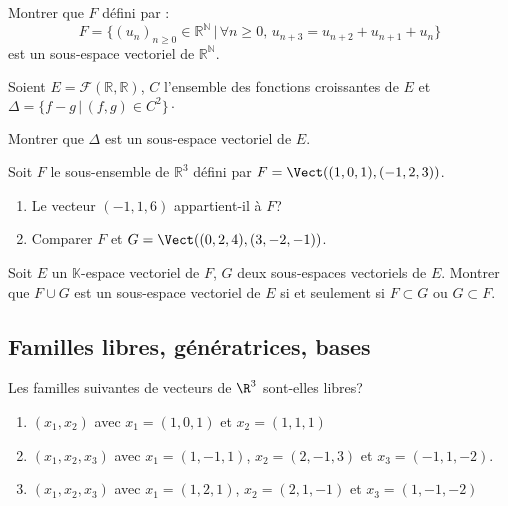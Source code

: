 \documentclass[a4paper,twoside,french,11pt]{VcCours}
\begin{document}
\begin{Exercice}{} Montrer que $F$ défini par :
$$ F = \lbrace (u_n)_{n \geq 0} \in \mathbb{R}^{\mathbb{N}} \, \vert \, \forall n \geq 0, \, u_{n+3}=u_{n+2}+u_{n+1}+u_n \rbrace$$
est un sous-espace vectoriel de $\mathbb{R}^{\mathbb{N}}$.
\end{Exercice}

\begin{Exercice}{} Soient $E = \mathcal{F}(\mathbb{R}, \mathbb{R})$, $C$ l'ensemble des fonctions croissantes de $E$ et $\Delta = \lbrace f-g \, \vert \, (f,g) \in C^2 \rbrace\cdot$

\noindent Montrer que $\Delta$ est un sous-espace vectoriel de $E$.
\end{Exercice}



\begin{Exercice}{} Soit $F$ le sous-ensemble de $\mathbb{R}^3$ défini par $F=\Vect((1,0,1), (-1,2,3))$. 
\begin{enumerate}
\item Le vecteur $(-1,1,6)$ appartient-il à $F$?
\item Comparer $F$ et $G=\Vect((0,2,4), (3,-2,-1))$. 
\end{enumerate}
\end{Exercice}

\begin{Exercice}{} Soit $E$ un $\mathbb{K}$-espace vectoriel de $F$, $G$ deux sous-espaces vectoriels de $E$. Montrer que $F \cup G$ est un sous-espace vectoriel de $E$ si et seulement si $F \subset G$ ou $G \subset F$.
\end{Exercice}

\medskip

\subsection{Familles libres, génératrices, bases}

\medskip

\begin{Exercice}{} Les familles suivantes de vecteurs de $\R^3$ sont-elles libres?
   \begin{enumerate}
  \item
        $(x_1 ,x_2)$ avec $x_1 = (1,0,1)$ et $x_2 = (1,1,1)$
      \item
        $(x_1 ,x_2 ,x_3)$ avec $x_1 = (1, - 1,1)$, $x_2 = (2, - 1,3)$ et $x_3 = ( - 1,1, - 2)$.
      \item
        $(x_1 ,x_2 ,x_3)$ avec $x_1 = (1,2,1)$, $x_2 = (2,1, - 1)$ et $x_3 = (1, - 1, - 2)$
    \end{enumerate}
\end{Exercice}
\end{document}
